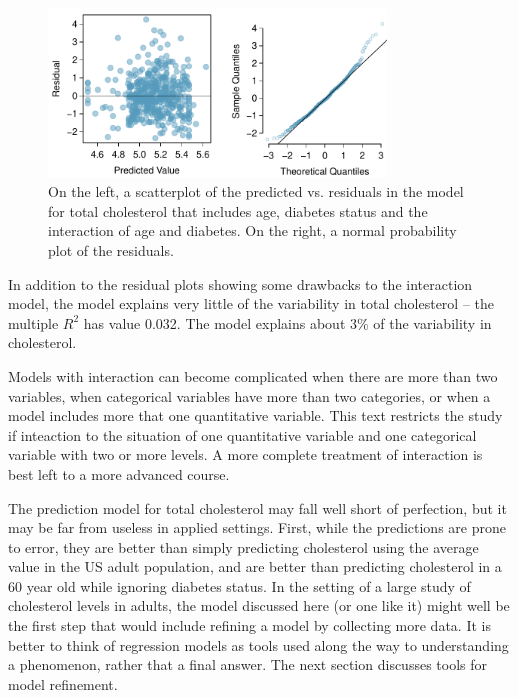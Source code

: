 
\begin{figure}[h!]
	\centering
	\includegraphics[width=0.8\textwidth]
	{ch_multiple_linear_regression_oi_biostat/figures/nhanesAgeDiabetesCholResidNormPlot/nhanesAgeDiabetesCholResidNormPlot.pdf}
    \caption{On the left, a scatterplot of the predicted vs. residuals in the model for total cholesterol that includes age, diabetes status and the interaction of age and diabetes.  On the right, a normal probability plot of the residuals.}
   	\label{nhanesAgeDiabetesCholResidNormPlot}
\end{figure}

In addition to the residual plots showing some drawbacks to the interaction model, the model explains very little of the variability in total cholesterol -- the multiple $R^2$ has value 0.032.  The model explains about 3\% of the variability in cholesterol.

Models with interaction can become complicated when there are more than two variables, when categorical variables have more than two categories, or when a model includes more that one quantitative variable. This text restricts the study if inteaction to the situation of one quantitative variable and one categorical variable with two or more levels. A more complete treatment of interaction is best left to a more advanced course.

The prediction model for total cholesterol may fall well short of perfection, but it may be far from useless in applied settings. First, while the predictions are prone to error, they are better than simply predicting cholesterol using the average value in the US adult population, and are better than predicting cholesterol in a 60 year old while ignoring diabetes status.  In the setting of a large study of cholesterol levels in adults, the model discussed here (or one like it) might well be the first step that would include refining a model by collecting more data.  It is better to think of regression models as tools used along the way to understanding a phenomenon, rather that a final answer.  The next section discusses tools for model refinement.



